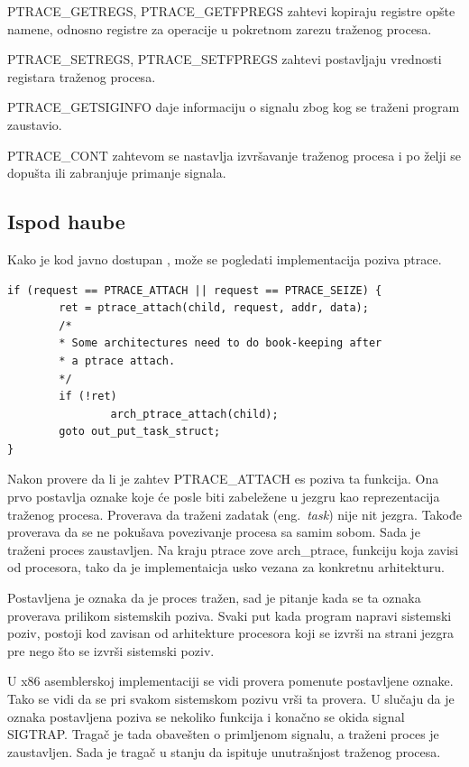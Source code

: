 \documentclass[a4paper]{article}
\begin{document}
PTRACE\_GETREGS, PTRACE\_GETFPREGS
    zahtevi kopiraju registre opšte namene, odnosno registre za operacije u pokretnom zarezu 
    traženog procesa.

PTRACE\_SETREGS, PTRACE\_SETFPREGS
    zahtevi postavljaju vrednosti registara traženog procesa.

PTRACE\_GETSIGINFO 
    daje informaciju o signalu zbog kog se traženi program zaustavio.

PTRACE\_CONT
    zahtevom se nastavlja izvršavanje traženog procesa i po želji se 
    dopušta ili zabranjuje primanje signala.
\subsection{Ispod haube}	

Kako je kod javno dostupan \cite{code}, može se pogledati implementacija poziva ptrace.
\begin{verbatim}
if (request == PTRACE_ATTACH || request == PTRACE_SEIZE) {
        ret = ptrace_attach(child, request, addr, data);
        /*
        * Some architectures need to do book-keeping after
        * a ptrace attach.
        */
        if (!ret)
                arch_ptrace_attach(child);
        goto out_put_task_struct;
}
\end{verbatim}

Nakon provere da li je zahtev PTRACE\_ATTACH es poziva ta funkcija.
Ona prvo postavlja oznake koje će posle biti zabeležene u jezgru kao reprezentacija 
traženog procesa. Proverava da traženi zadatak (eng.~{\em task}) nije nit jezgra. 
Takođe proverava da se ne pokušava povezivanje procesa sa samim sobom.
Sada je traženi proces zaustavljen. Na kraju ptrace zove arch\_ptrace, funkciju koja zavisi
od procesora, tako da je implementaicja usko vezana za konkretnu arhitekturu.

Postavljena je oznaka da je proces tražen, sad je pitanje kada se ta oznaka proverava prilikom 
sistemskih poziva. Svaki put kada program napravi sistemski poziv, postoji kod zavisan od arhitekture
procesora koji se izvrši na strani jezgra pre nego što se izvrši sistemski poziv.

U x86 asemblerskoj implementaciji se vidi provera pomenute postavljene oznake\cite{blog}.
Tako se vidi da se pri svakom sistemskom pozivu vrši ta provera. 
U slučaju da je oznaka postavljena poziva se nekoliko funkcija i konačno se okida signal SIGTRAP.
Tragač je tada obavešten o primljenom signalu, a traženi proces je zaustavljen. 
Sada je tragač u stanju da ispituje unutrašnjost traženog procesa.
\end{document}
